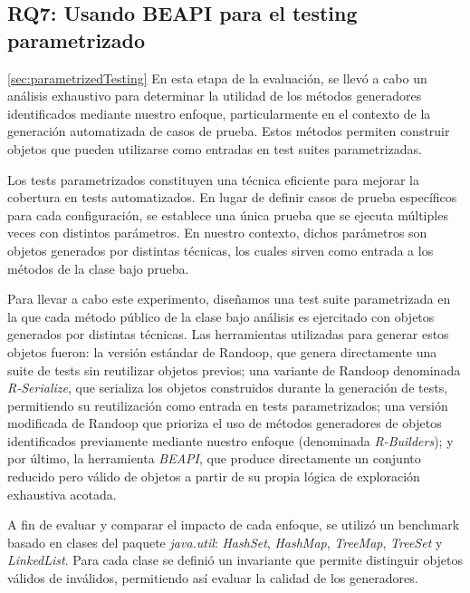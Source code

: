

\subsection{RQ7: Usando BEAPI para el testing parametrizado}
\ref{sec:parametrizedTesting}
En esta etapa de la evaluación, se llevó a cabo un análisis exhaustivo para determinar la 
utilidad de los métodos generadores identificados mediante nuestro enfoque, particularmente 
en el contexto de la generación automatizada de casos de prueba. Estos métodos permiten construir 
objetos que pueden utilizarse como entradas en test suites parametrizadas.

Los tests parametrizados constituyen una técnica eficiente para mejorar la cobertura en tests 
automatizados. En lugar de definir casos de prueba específicos para cada configuración, se 
establece una única prueba que se ejecuta múltiples veces con distintos parámetros. En nuestro 
contexto, dichos parámetros son objetos generados por distintas técnicas, los cuales sirven como 
entrada a los métodos de la clase bajo prueba.

Para llevar a cabo este experimento, diseñamos una test suite parametrizada en la que cada método 
público de la clase bajo análisis es ejercitado con objetos generados por distintas técnicas. Las 
herramientas utilizadas para generar estos objetos fueron: la versión estándar de Randoop, que 
genera directamente una suite de tests sin reutilizar objetos previos; una variante de Randoop 
denominada \emph{R-Serialize}, que serializa los objetos construidos durante la generación de 
tests, permitiendo su reutilización como entrada en tests parametrizados; una versión modificada 
de Randoop que prioriza el uso de métodos generadores de objetos identificados previamente mediante 
nuestro enfoque (denominada \emph{R-Builders}); y por último, la herramienta \emph{BEAPI}, que 
produce directamente un conjunto reducido pero válido de objetos a partir de su propia lógica de 
exploración exhaustiva acotada.

A fin de evaluar y comparar el impacto de cada enfoque, se utilizó un benchmark basado en clases 
del paquete \emph{java.util}: \emph{HashSet}, \emph{HashMap}, \emph{TreeMap}, \emph{TreeSet} y \emph{LinkedList}.
Para cada clase se definió un invariante que permite distinguir objetos válidos de inválidos, permitiendo así evaluar la calidad de los generadores.


